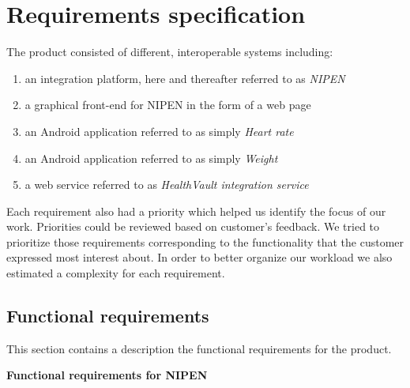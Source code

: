 \section{Requirements specification}

The product consisted of different, interoperable systems including:
\begin{enumerate}[1.]
\item an integration platform, here and thereafter referred to as \textit{NIPEN}
\item a graphical front-end for NIPEN in the form of a web page
\item an Android application referred to as simply \textit{Heart rate}
\item an Android application referred to as simply \textit{Weight}
\item a web service referred to as \textit{HealthVault integration service}
\end{enumerate}

Each requirement also had a priority which helped us identify the focus of our work.
Priorities could be reviewed based on customer's feedback. 
We tried to prioritize those requirements corresponding to the functionality that the customer expressed most interest about. 
In order to better organize our workload we also estimated a complexity for each requirement.

\newpage
\subsection{Functional requirements}
\label{section:functionalreq}

This section contains a description the functional requirements for the product.

\textbf{Functional requirements for NIPEN}

